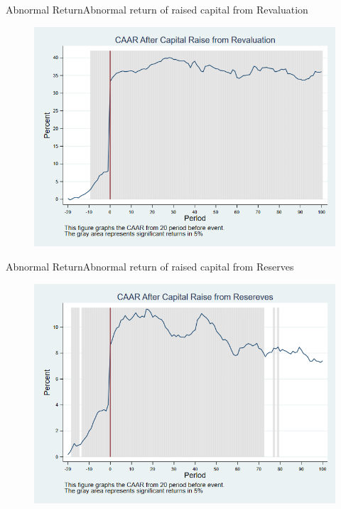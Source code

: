 \documentclass{beamer}
\begin{document}
\begin{frame}{Abnormal Return}{Abnormal return of raised capital from Revaluation}
\label{abreturnrevalutionMarket}
\begin{figure}
\centering
\includegraphics[width=0.65\linewidth]{AbReturnRevalution_Market}
\label{fig:abreturnrevalution4}
\end{figure}

\hfill\hyperlink{abreturnrevalution}{}
\end{frame}


\begin{frame}{Abnormal Return}{Abnormal return of raised capital from Reserves}
\label{abreturnsavingMarket}
\begin{figure}
\centering
\includegraphics[width=0.65\linewidth]{AbReturnSaving_Market}
\label{fig:abreturnsaving4}
\end{figure}

\hfill\hyperlink{abreturnsaving}{}
\end{frame}
\end{document}
